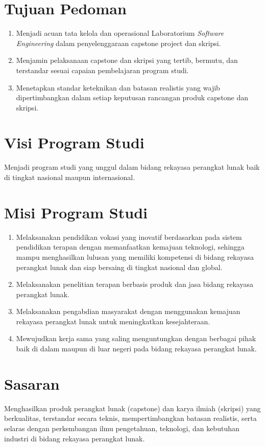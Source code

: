 \documentclass[12pt,a4paper]{report}
\begin{document}
\section{Tujuan Pedoman}
\begin{enumerate}
\item Menjadi acuan tata kelola dan operasional Laboratorium \emph{Software Engineering} dalam penyelenggaraan capstone project dan skripsi.
\item Menjamin pelaksanaan capstone dan skripsi yang tertib, bermutu, dan terstandar sesuai capaian pembelajaran program studi.
\item Menetapkan standar keteknikan dan batasan realistis yang wajib dipertimbangkan dalam setiap keputusan rancangan produk capstone dan skripsi.
\end{enumerate}

\section{Visi Program Studi}
Menjadi program studi yang unggul dalam bidang rekayasa perangkat lunak baik di tingkat nasional maupun internasional.

\section{Misi Program Studi}
\begin{enumerate}
\item Melaksanakan pendidikan vokasi yang inovatif berdasarkan pada sistem pendidikan terapan dengan memanfaatkan kemajuan teknologi, sehingga mampu menghasilkan lulusan yang memiliki kompetensi di bidang re\-ka\-ya\-sa pe\-rang\-kat lu\-nak dan siap bersaing di tingkat nasional dan global.
\item Melaksanakan penelitian terapan berbasis produk dan jasa bidang rekayasa perangkat lunak.
\item Melaksanakan pengabdian masyarakat dengan menggunakan kemajuan rekayasa perangkat lunak untuk meningkatkan kesejahteraan.
\item Mewujudkan kerja sama yang saling menguntungkan dengan berbagai pihak baik di dalam maupun di luar negeri pada bidang rekayasa perangkat lunak.
\end{enumerate}

\section{Sasaran}
Menghasilkan produk perangkat lunak (capstone) dan karya ilmiah (skripsi) yang berkualitas, terstandar secara teknis, mempertimbangkan batasan realistis, serta selaras dengan perkembangan ilmu pengetahuan, teknologi, dan kebutuhan industri di bidang rekayasa perangkat lunak.
\end{document}
